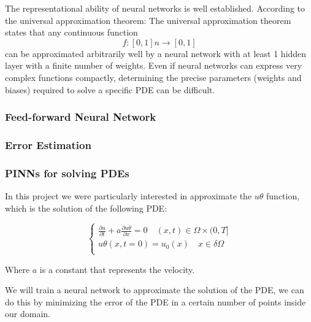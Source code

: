 \documentclass{article}
\begin{document}
The representational ability of neural networks is well established. According to the universal approximation theorem:
The universal approximation theorem states that any continuous function  $$f : [0, 1]n \rightarrow [0, 1]$$  can be approximated arbitrarily well by a neural network with at least 1 hidden layer with a finite number of weights.
Even if neural networks can express very complex functions compactly, determining the precise parameters (weights and biases) required to solve a specific PDE can be difficult.



\subsubsection{Feed-forward Neural Network}


\subsubsection{Error Estimation}


\subsubsection{PINNs for solving PDEs} 


In this project we were particularly interested in approximate the $u\theta$ function, which is the solution of the following PDE:

\begin{equation*}
    \begin{cases}
    \frac{\partial u}{\partial t} + a \frac{\partial u\theta}{\partial x} = 0 \quad (x,t) \in \Omega \times (0,T] \\
    u\theta(x,t=0) = u_0(x) \quad x \in \delta \Omega \\
    \end{cases}
\end{equation*}

Where $a$ is a constant that represents the velocity.

We will train a neural network to approximate the solution of the PDE, we can do this by minimizing the error of the PDE in a certain number of points inside our domain.
\end{document}
